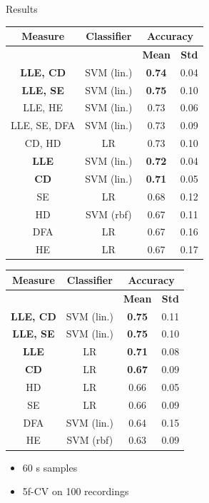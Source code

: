 \documentclass{beamer}
\begin{document}
\begin{frame}{Results}

\begin{table}[tbp]
\fontsize{7pt}{10pt}
\selectfont
\parbox[t]{0.495\linewidth}{
\centering
\begin{tabular}[t]{|c|c|c|c|}
\hline
\textbf{Measure} & \textbf{Classifier} & \multicolumn{2}{c}{\textbf{Accuracy}} \vline \\ \hline
& & \textbf{Mean} & \textbf{Std} \\ \hline
\textbf{LLE, CD} & SVM (lin.) & \textbf{0.74} & 0.04 \\ \hline 
\textbf{LLE, SE} & SVM (lin.) & \textbf{0.75} & 0.10 \\ \hline 
LLE, HE & SVM (lin.) & 0.73 & 0.06 \\ \hline 
LLE, SE, DFA & SVM (lin.) & 0.73 & 0.09 \\ \hline 
CD, HD & LR & 0.73 & 0.10 \\ \hhline{=|=|=|=}
\textbf{LLE} & SVM (lin.) & \textbf{0.72} & 0.04 \\ \hline
\textbf{CD} & SVM (lin.) & \textbf{0.71} & 0.05 \\ \hline 
SE & LR & 0.68 & 0.12 \\ \hline
HD & SVM (rbf) & 0.67 & 0.11 \\ \hline
DFA & LR & 0.67 & 0.16 \\ \hline
HE & LR & 0.67 & 0.17 \\ \hline
\end{tabular}
}
\hfill
\parbox[t]{0.495\linewidth}{
\centering
\begin{tabular}[t]{|c|c|c|c|}
\hline
\textbf{Measure} & \textbf{Classifier} & \multicolumn{2}{c}{\textbf{Accuracy}} \vline \\ \hline
& & \textbf{Mean} & \textbf{Std} \\ \hline
\textbf{LLE, CD} & SVM (lin.) & \textbf{0.75} & 0.11 \\ \hline 
\textbf{LLE, SE} & SVM (lin.) & \textbf{0.75} & 0.10 \\ \hhline{=|=|=|=}
\textbf{LLE} & LR & \textbf{0.71}  & 0.08 \\ \hline 
\textbf{CD} & LR & \textbf{0.67} & 0.09 \\ \hline
HD & LR & 0.66 & 0.05 \\ \hline
SE & LR & 0.66 & 0.09 \\ \hline
DFA & SVM (lin.) & 0.64 & 0.15 \\ \hline
HE & SVM (rbf) & 0.63 & 0.09 \\ \hline
\end{tabular}
\ssmall
\begin{itemize}
  \item 60 s samples
  \item 5f-CV on 100 recordings
\end{itemize}
}
\end{table}
\end{frame}
\end{document}
